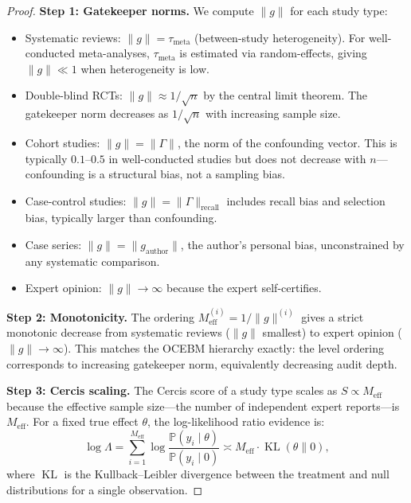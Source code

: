 \documentclass[12pt,a4paper]{article}
\theoremstyle{remark}
\newcommand{\Pbb}{\mathbb{P}}
\newcommand{\Cercis}{\textsf{Cercis}}
\DeclareMathOperator{\KL}{KL}
\begin{document}
\begin{proof}
\noindent\textbf{Step 1: Gatekeeper norms.}
We compute $\|g\|$ for each study type:
\begin{itemize}[leftmargin=*]
  \item Systematic reviews: $\|g\| = \tau_{\text{meta}}$ (between-study
  heterogeneity). For well-conducted meta-analyses, $\tau_{\text{meta}}$ is
  estimated via random-effects, giving $\|g\| \ll 1$ when heterogeneity is
  low.
  \item Double-blind RCTs: $\|g\| \approx 1/\sqrt{n}$ by the central limit
  theorem. The gatekeeper norm decreases as $1/\sqrt{n}$ with increasing
  sample size.
  \item Cohort studies: $\|g\| = \|\Gamma\|$, the norm of the confounding
  vector. This is typically $0.1$--$0.5$ in well-conducted studies but
  does not decrease with $n$---confounding is a structural bias, not a
  sampling bias.
  \item Case-control studies: $\|g\| = \|\Gamma\|_{\text{recall}}$ includes
  recall bias and selection bias, typically larger than confounding.
  \item Case series: $\|g\| = \|g_{\text{author}}\|$, the author's personal
  bias, unconstrained by any systematic comparison.
  \item Expert opinion: $\|g\| \to \infty$ because the expert self-certifies.
\end{itemize}

\smallskip
\noindent\textbf{Step 2: Monotonicity.}
The ordering $M_{\text{eff}}^{(i)} = 1/\|g\|^{(i)}$ gives a strict
monotonic decrease from systematic reviews ($\|g\|$ smallest) to expert
opinion ($\|g\| \to \infty$). This matches the OCEBM hierarchy exactly:
the level ordering corresponds to increasing gatekeeper norm, equivalently
decreasing audit depth.

\smallskip
\noindent\textbf{Step 3: Cercis scaling.}
The \Cercis{} score of a study type scales as $S \propto M_{\text{eff}}$
because the effective sample size---the number of independent expert
reports---is $M_{\text{eff}}$. For a fixed true effect $\theta$, the
log-likelihood ratio evidence is:
\begin{equation}
  \log \Lambda = \sum_{i=1}^{M_{\text{eff}}} \log
  \frac{\Pbb(y_i \mid \theta)}{\Pbb(y_i \mid 0)} \asymp
  M_{\text{eff}} \cdot \KL(\theta \parallel 0),
\end{equation}
where $\KL$ is the Kullback--Leibler divergence between the treatment
and null distributions for a single observation.
\end{proof}
\end{document}
